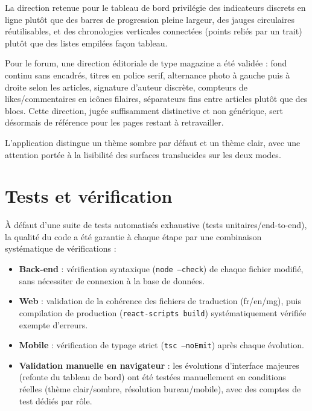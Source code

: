 \documentclass[12pt,a4paper]{report}
\begin{document}
La direction retenue pour le tableau de bord privilégie des indicateurs discrets en ligne plutôt que des barres de progression pleine largeur, des jauges circulaires réutilisables, et des chronologies verticales connectées (points reliés par un trait) plutôt que des listes empilées façon tableau.

Pour le forum, une direction éditoriale de type \og magazine \fg{} a été validée : fond continu sans encadrés, titres en police serif, alternance photo à gauche puis à droite selon les articles, signature d'auteur discrète, compteurs de likes/commentaires en icônes filaires, séparateurs fins entre articles plutôt que des blocs. Cette direction, jugée suffisamment distinctive et non générique, sert désormais de référence pour les pages restant à retravailler.

L'application distingue un thème sombre par défaut et un thème clair, avec une attention portée à la lisibilité des surfaces translucides sur les deux modes.

\chapter{Tests et vérification}
\label{chap:tests}

À défaut d'une suite de tests automatisés exhaustive (tests unitaires/end-to-end), la qualité du code a été garantie à chaque étape par une combinaison systématique de vérifications :

\begin{itemize}
    \item \textbf{Back-end} : vérification syntaxique (\texttt{node --check}) de chaque fichier modifié, sans nécessiter de connexion à la base de données.
    \item \textbf{Web} : validation de la cohérence des fichiers de traduction (fr/en/mg), puis compilation de production (\texttt{react-scripts build}) systématiquement vérifiée exempte d'erreurs.
    \item \textbf{Mobile} : vérification de typage strict (\texttt{tsc --noEmit}) après chaque évolution.
    \item \textbf{Validation manuelle en navigateur} : les évolutions d'interface majeures (refonte du tableau de bord) ont été testées manuellement en conditions réelles (thème clair/sombre, résolution bureau/mobile), avec des comptes de test dédiés par rôle.
\end{itemize}
\end{document}

